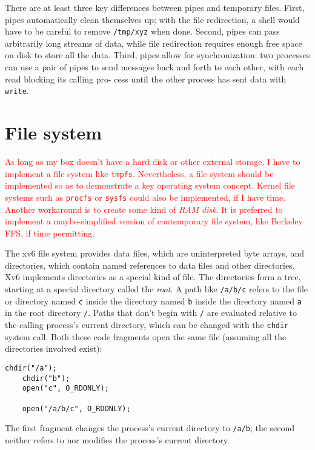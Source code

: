 \documentclass{report}
\begin{document}
	There are at least three key differences between pipes and temporary files. First, pipes
	automatically clean themselves up; with the file redirection, a shell would have to be
	careful to remove \texttt{/tmp/xyz} when done. Second, pipes can pass arbitrarily long
	streams of data, while file redirection requires enough free space on disk to store all
	the data. Third, pipes allow for synchronization: two processes can use a pair of pipes
	to send messages back and forth to each other, with each read blocking its calling pro-
	cess until the other process has sent data with \texttt{write}.
	
	\section{File system}
	\textcolor{red}{
		As long as my box doesn't have a hard disk or other external storage, I have to implement
		a file system like \texttt{tmpfs}.  Nevertheless, a file system should be implemented so
		as to demonstrate a key operating system concept.  Kernel file systems such as 
		\texttt{procfs} or \texttt{sysfs} could also be implemented, if I have time.  Another
		workaround is to create some kind of \emph{RAM disk}.  It is preferred to implement
		a maybe-simplified version of contemporary file system, like Berkeley FFS, if time
		permitting.
	}
	
	The xv6 file system provides data files, which are uninterpreted byte arrays, and
	directories, which contain named references to data files and other directories. Xv6
	implements directories as a special kind of file. The directories form a tree, starting at
	a special directory called the \emph{root}. A path like \texttt{/a/b/c} refers to the file or directory
	named \texttt{c} inside the directory named \texttt{b} inside the directory named \texttt{a} in the root 
	directory \texttt{/}. Paths that don't begin with \texttt{/} are evaluated relative to the calling 
	process's current directory, which can be changed with the \texttt{chdir} system call. Both these code
	fragments open the same file (assuming all the directories involved exist):
	\begin{lstlisting}[style=c]
	chdir("/a");
	chdir("b");
	open("c", O_RDONLY);
	
	open("/a/b/c", O_RDONLY);
	\end{lstlisting}
	The first fragment changes the process's current directory to \texttt{/a/b}; the second neither
	refers to nor modifies the process's current directory.
	
\end{document}

